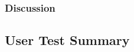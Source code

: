 \documentclass[../../main.tex]{subfiles}
\begin{document}
			\subsubsection{Discussion}


		\subsection{User Test Summary}



\end{document}
